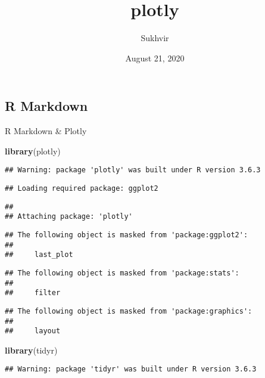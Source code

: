 \documentclass[]{article}
\title{plotly}
\author{Sukhvir}
\date{August 21, 2020}
\newenvironment{Shaded}{\begin{snugshade}}{\end{snugshade}}
\newcommand{\KeywordTok}[1]{\textcolor[rgb]{0.13,0.29,0.53}{\textbf{#1}}}
\newcommand{\NormalTok}[1]{#1}
\begin{document}
\maketitle

\hypertarget{r-markdown}{%
\subsection{R Markdown}\label{r-markdown}}

R Markdown \& Plotly

\begin{Shaded}
\begin{Highlighting}[]
\KeywordTok{library}\NormalTok{(plotly)}
\end{Highlighting}
\end{Shaded}

\begin{verbatim}
## Warning: package 'plotly' was built under R version 3.6.3
\end{verbatim}

\begin{verbatim}
## Loading required package: ggplot2
\end{verbatim}

\begin{verbatim}
## 
## Attaching package: 'plotly'
\end{verbatim}

\begin{verbatim}
## The following object is masked from 'package:ggplot2':
## 
##     last_plot
\end{verbatim}

\begin{verbatim}
## The following object is masked from 'package:stats':
## 
##     filter
\end{verbatim}

\begin{verbatim}
## The following object is masked from 'package:graphics':
## 
##     layout
\end{verbatim}

\begin{Shaded}
\begin{Highlighting}[]
\KeywordTok{library}\NormalTok{(tidyr)}
\end{Highlighting}
\end{Shaded}

\begin{verbatim}
## Warning: package 'tidyr' was built under R version 3.6.3
\end{verbatim}
\end{document}
